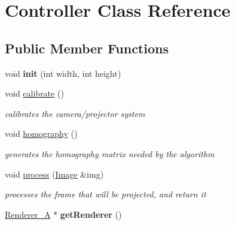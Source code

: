 \hypertarget{class_controller}{\section{Controller Class Reference}
\label{class_controller}
}
\subsection*{Public Member Functions}
\begin{DoxyCompactItemize}
\item 
\hypertarget{class_controller_a53e2dfd2b170b86a607fb23f69c13859}{void {\bfseries init} (int width, int height)}\label{class_controller_a53e2dfd2b170b86a607fb23f69c13859}

\item 
\hypertarget{class_controller_a3281d6167b17007535c5414c5c409b4b}{void \hyperlink{class_controller_a3281d6167b17007535c5414c5c409b4b}{calibrate} ()}\label{class_controller_a3281d6167b17007535c5414c5c409b4b}

\begin{DoxyCompactList}\small\item\em calibrates the camera/projector system \end{DoxyCompactList}\item 
\hypertarget{class_controller_ab05765b131b9cdf49b0665cb4bc91140}{void \hyperlink{class_controller_ab05765b131b9cdf49b0665cb4bc91140}{homography} ()}\label{class_controller_ab05765b131b9cdf49b0665cb4bc91140}

\begin{DoxyCompactList}\small\item\em generates the homography matrix needed by the algorithm \end{DoxyCompactList}\item 
\hypertarget{class_controller_aa9a8284feff5b720249e3fc6ad9b1592}{void \hyperlink{class_controller_aa9a8284feff5b720249e3fc6ad9b1592}{process} (\hyperlink{class_image}{Image} \&img)}\label{class_controller_aa9a8284feff5b720249e3fc6ad9b1592}

\begin{DoxyCompactList}\small\item\em processes the frame that will be projected, and return it \end{DoxyCompactList}\item 
\hypertarget{class_controller_a0220f7841ce40fd47e693b3e89e8cd52}{\hyperlink{class_renderer___a}{Renderer\-\_\-\-A} $\ast$ {\bfseries get\-Renderer} ()}\label{class_controller_a0220f7841ce40fd47e693b3e89e8cd52}


\end{DoxyCompactItemize}
